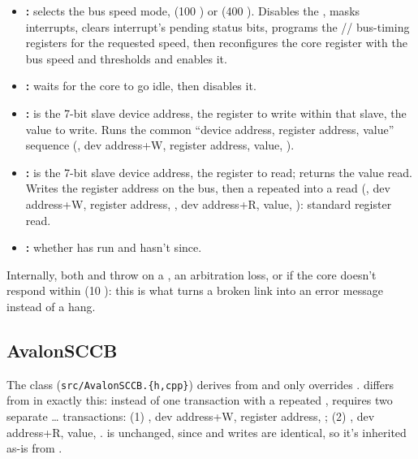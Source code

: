 \begin{itemize}
    \item \textbf{:}  selects the bus speed mode,  (100 ) or  (400 ). Disables the , masks interrupts, clears interrupt's pending status bits, programs the // bus-timing registers for the requested speed, then reconfigures the core  register with the bus speed and  thresholds and enables it.
    \item \textbf{:} waits for the core to go idle, then disables it.
    \item \textbf{:}  is the 7-bit  slave device address,  the register to write within that slave,  the value to write. Runs the common  ``device address, register address, value'' sequence (, dev address+W, register address, value, ).
    \item \textbf{:}  is the 7-bit  slave device address,  the register to read; returns the value read. Writes the register address on the  bus, then a repeated  into a read (, dev address+W, register address, , dev address+R, value, ): standard  register read.
    \item \textbf{:} whether  has run and  hasn't since.
\end{itemize}

Internally, both  and  throw  on a , an arbitration loss, or if the core doesn't respond within  (10 ): this is what turns a broken link into an error message instead of a hang.

\subsection{AvalonSCCB}
\label{subsec:fpgasteel-i2c-avalonsccb}

The  class (\lstinline[style=inlineFsRepo]!src/AvalonSCCB.{h,cpp}!) derives from  and only overrides .  differs from  in exactly this: instead of one transaction with a repeated ,  requires two separate \ldots{} transactions: (1) , dev address+W, register address, ; (2) , dev address+R, value, .  is unchanged, since  and  writes are identical, so it's inherited as-is from .


